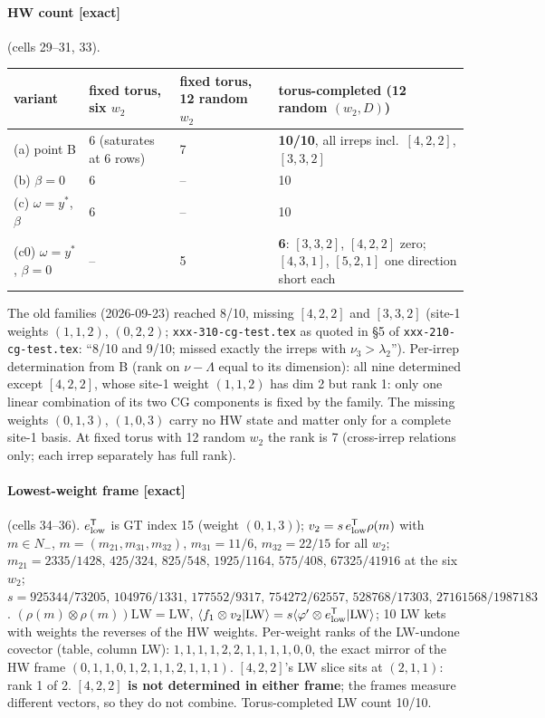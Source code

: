 \documentclass[11pt]{article}
\newcommand{\ex}{\textbf{[exact]}}
\newcommand{\nb}[1]{\texttt{#1}}
\begin{document}
\paragraph{HW count \ex} (cells 29--31, 33).
\begin{center}\small
\begin{tabular}{@{}p{2.6cm}p{2.6cm}p{2.8cm}p{6.2cm}@{}}\toprule
variant & fixed torus, six $w_2$ & fixed torus, 12 random $w_2$ & torus-completed (12 random $(w_2,D)$)\\\midrule
(a) point B & 6 (saturates at 6 rows) & 7 & \textbf{10/10}, all irreps incl.\ $[4,2,2]$, $[3,3,2]$\\
(b) $\beta=0$ & 6 & -- & 10\\
(c) $\omega=y^*$, $\beta$ & 6 & -- & 10\\
(c0) $\omega=y^*$, $\beta=0$ & -- & 5 & \textbf{6}: $[3,3,2]$, $[4,2,2]$ zero; $[4,3,1]$, $[5,2,1]$ one direction short each\\\bottomrule
\end{tabular}
\end{center}
The old families (2026-09-23) reached 8/10, missing $[4,2,2]$ and $[3,3,2]$ (site-1 weights $(1,1,2)$, $(0,2,2)$; \nb{xxx-310-cg-test.tex} as quoted in \S5 of \nb{xxx-210-cg-test.tex}: ``8/10 and 9/10; missed exactly the irreps with $\nu_3>\lambda_2$''). Per-irrep determination from B (rank on $\nu-\Lambda$ equal to its dimension): all nine determined except $[4,2,2]$, whose site-1 weight $(1,1,2)$ has dim 2 but rank 1: only one linear combination of its two CG components is fixed by the family. The missing weights $(0,1,3)$, $(1,0,3)$ carry no HW state and matter only for a complete site-1 basis. At fixed torus with 12 random $w_2$ the rank is 7 (cross-irrep relations only; each irrep separately has full rank).

\paragraph{Lowest-weight frame \ex} (cells 34--36). $e_{\rm low}^{\mathsf T}$ is GT index 15 (weight $(0,1,3)$); $v_2=s\,e_{\rm low}^{\mathsf T}\rho(m)$ with $m\in N_-$, $m=(m_{21},m_{31},m_{32})$, $m_{31}=11/6$, $m_{32}=22/15$ for all $w_2$; $m_{21}=2335/1428,\,425/324,\,825/548,\,1925/1164,\,575/408,\,67325/41916$ at the six $w_2$; $s=925344/73205,\,104976/1331,\,177552/9317,\,754272/62557,\,528768/17303,\,27161568/1987183$. $(\rho(m)\otimes\rho(m))\mathrm{LW}=\mathrm{LW}$, $\langle f_1\otimes v_2|\mathrm{LW}\rangle=s\langle\varphi'\otimes e_{\rm low}^{\mathsf T}|\mathrm{LW}\rangle$; 10 LW kets with weights the reverses of the HW weights. Per-weight ranks of the LW-undone covector (table, column LW): $1,1,1,1,2,2,1,1,1,1,0,0$, the exact mirror of the HW frame $(0,1,1,0,1,2,1,1,2,1,1,1)$. $[4,2,2]$'s LW slice sits at $(2,1,1)$: rank 1 of 2. \textbf{$[4,2,2]$ is not determined in either frame}; the frames measure different vectors, so they do not combine. Torus-completed LW count 10/10.
\end{document}

